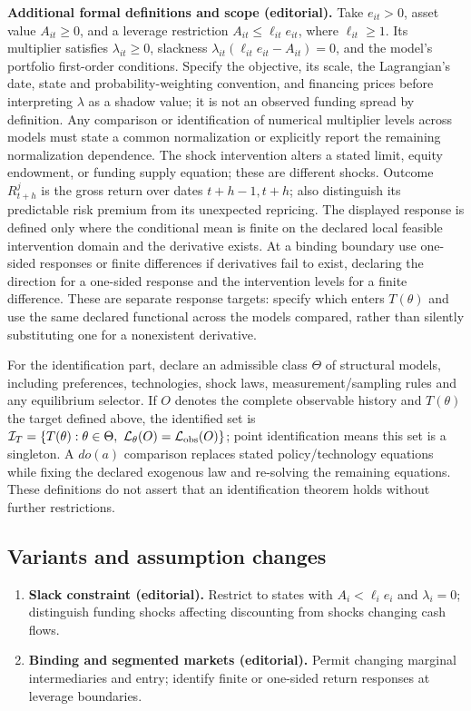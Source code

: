 \documentclass[11pt,a4paper]{article}
\begin{document}
\textbf{Additional formal definitions and scope (editorial).} Take \(e_{it}>0\), asset value \(A_{it}\geq0\), and a leverage restriction \(A_{it}\leq\ell_{it}e_{it}\), where \(\ell_{it}\geq1\). Its multiplier satisfies \(\lambda_{it}\geq0\), slackness \(\lambda_{it}(\ell_{it}e_{it}-A_{it})=0\), and the model's portfolio first-order conditions. Specify the objective, its scale, the Lagrangian's date, state and probability-weighting convention, and financing prices before interpreting \(\lambda\) as a shadow value; it is not an observed funding spread by definition. Any comparison or identification of numerical multiplier levels across models must state a common normalization or explicitly report the remaining normalization dependence. The shock intervention alters a stated limit, equity endowment, or funding supply equation; these are different shocks. Outcome \(R^j_{t+h}\) is the gross return over dates \(t+h-1,t+h\); also distinguish its predictable risk premium from its unexpected repricing. The displayed response is defined only where the conditional mean is finite on the declared local feasible intervention domain and the derivative exists. At a binding boundary use one-sided responses or finite differences if derivatives fail to exist, declaring the direction for a one-sided response and the intervention levels for a finite difference. These are separate response targets: specify which enters \(T(\theta)\) and use the same declared functional across the models compared, rather than silently substituting one for a nonexistent derivative.

For the identification part, declare an admissible class \(\Theta\) of structural models, including preferences, technologies, shock laws, measurement/sampling rules and any equilibrium selector. If \(O\) denotes the complete observable history and \(T(\theta)\) the target defined above, the identified set is \(\mathcal I_T=\{T(\theta):\theta\in\Theta,\ \mathcal L_\theta(O)=\mathcal L_{\rm obs}(O)\}\); point identification means this set is a singleton. A \(do(a)\) comparison replaces stated policy/technology equations while fixing the declared exogenous law and re-solving the remaining equations. These definitions do not assert that an identification theorem holds without further restrictions.
\subsection*{Variants and assumption changes}
\begin{enumerate}
\item \textbf{Slack constraint (editorial).} Restrict to states with \(A_i<\ell_i e_i\) and \(\lambda_i=0\); distinguish funding shocks affecting discounting from shocks changing cash flows.
\item \textbf{Binding and segmented markets (editorial).} Permit changing marginal intermediaries and entry; identify finite or one-sided return responses at leverage boundaries.
\end{enumerate}
\end{document}
